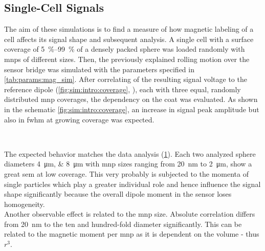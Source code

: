 \subsection{Single-Cell Signals}
The aim of these simulations is to find a measure of how magnetic labeling of a cell affects its signal shape and subsequent analysis. A single cell with a surface coverage of \SIrange{5}{99}{\percent} of a densely packed sphere was loaded randomly with \glspl{mnp} of different sizes. Then, the previously explained rolling motion over the sensor bridge was simulated with the parameters specified in \cref{tab:params:mag_sim}. After correlating of the resulting signal voltage to the reference dipole (\cref{fig:sim:intro:coverage}, \blueCircle), each with three equal, randomly distributed \gls{mnp} coverages, the dependency on the coat was evaluated. As shown in the schematic \cref{fig:sim:intro:coverage}, an increase in signal peak amplitude but also in \gls{fwhm} at growing coverage was expected. 
\begin{figure}[!h] 	
	\centering
	 \hfill
	\addtocounter{subfigure}{-1}
	 \\
	\vspace{\baselineskip}	
	\addtocounter{subfigure}{-1}
	\hfill
	\addtocounter{subfigure}{-1}
	\label{fig:sim:coverage}
\end{figure}
\clearpage
The expected behavior matches the data analysis (\cref{fig:sim:coverage}). Each two analyzed sphere diameters \SIlist{4;8}{\micro\meter} with \gls{mnp} sizes ranging from \SI{20}{\nano\meter} to \SI{2}{\micro\meter}, show a great \gls{sem} at low coverage. This very probably is subjected to the momenta of single particles which play a greater individual role and hence influence the signal shape significantly because the overall dipole moment in the sensor loses homogeneity. \\
Another observable effect is related to the \gls{mnp} size. Absolute correlation differs from \SI{20}{\nano\meter} to the ten and hundred-fold diameter significantly. This can be related to the magnetic moment per \gls{mnp} as it is dependent on the volume - thus $r^3$.

